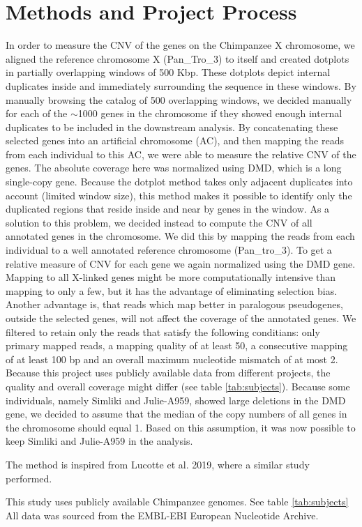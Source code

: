 \section*{Methods and Project Process}
In order to measure the CNV of the genes on the Chimpanzee X chromosome, we aligned the reference chromosome X (Pan\_Tro\_3) to itself and created dotplots in partially overlapping windows of 500 Kbp. These dotplots depict internal duplicates inside and immediately surrounding the sequence in these windows. By manually browsing the catalog of 500 overlapping windows, we decided manually for each of the $\sim$1000 genes in the chromosome if they showed enough internal duplicates to be included in the downstream analysis. By concatenating these selected genes into an artificial chromosome (AC), and then mapping the reads from each individual to this AC, we were able to measure the relative CNV of the genes. The absolute coverage here was normalized using DMD, which is a long single-copy gene. Because the dotplot method takes only adjacent duplicates into account (limited window size), this method makes it possible to identify only the duplicated regions that reside inside and near by genes in the window. As a solution to this problem, we decided instead to  compute the CNV of all annotated genes in the chromosome. We did this by mapping the reads from each individual to a well annotated reference chromosome (Pan\_tro\_3). To get a relative measure of CNV for each gene we again normalized using the DMD gene. Mapping to all X-linked genes might be more computationally intensive than mapping to only a few, but it has the advantage of eliminating selection bias. Another advantage is, that reads which map better in paralogous pseudogenes, outside the selected genes, will not affect the coverage of the annotated genes. We filtered to retain only the reads that satisfy the following conditians: only primary mapped reads, a mapping quality of at least 50, a consecutive mapping of at least 100 bp and an overall maximum nucleotide mismatch of at most 2. Because this project uses publicly available data from different projects, the quality and overall coverage might differ (see table \ref{tab:subjects}). Because some individuals, namely Simliki and Julie-A959, showed large deletions in the DMD gene, we decided to assume that the median of the copy numbers of all genes in the chromosome should equal 1. Based on this assumption, it was now possible to keep Simliki and Julie-A959 in the analysis.

The method is inspired from Lucotte et al. 2019\cite{Lucotte907}, where a similar study performed.

This study uses publicly available Chimpanzee genomes. See table \ref{tab:subjects} All data was sourced from the EMBL-EBI European Nucleotide Archive.